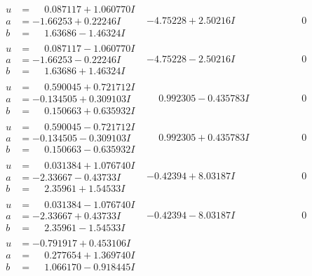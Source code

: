 \documentclass[1p]{elsarticle_modified}
\theoremstyle{definition}
\begin{document}
$$\begin{array}{c|c|c}
\begin{aligned}
u &= \phantom{-}0.087117 + 1.060770 I \\
a &= -1.66253 + 0.22246 I \\
b &= \phantom{-}1.63686 - 1.46324 I\end{aligned}
 & -4.75228 + 2.50216 I & \phantom{-0.000000 } 0 \\ \hline\begin{aligned}
u &= \phantom{-}0.087117 - 1.060770 I \\
a &= -1.66253 - 0.22246 I \\
b &= \phantom{-}1.63686 + 1.46324 I\end{aligned}
 & -4.75228 - 2.50216 I & \phantom{-0.000000 } 0 \\ \hline\begin{aligned}
u &= \phantom{-}0.590045 + 0.721712 I \\
a &= -0.134505 + 0.309103 I \\
b &= \phantom{-}0.150663 + 0.635932 I\end{aligned}
 & \phantom{-}0.992305 - 0.435783 I & \phantom{-0.000000 } 0 \\ \hline\begin{aligned}
u &= \phantom{-}0.590045 - 0.721712 I \\
a &= -0.134505 - 0.309103 I \\
b &= \phantom{-}0.150663 - 0.635932 I\end{aligned}
 & \phantom{-}0.992305 + 0.435783 I & \phantom{-0.000000 } 0 \\ \hline\begin{aligned}
u &= \phantom{-}0.031384 + 1.076740 I \\
a &= -2.33667 - 0.43733 I \\
b &= \phantom{-}2.35961 + 1.54533 I\end{aligned}
 & -0.42394 + 8.03187 I & \phantom{-0.000000 } 0 \\ \hline\begin{aligned}
u &= \phantom{-}0.031384 - 1.076740 I \\
a &= -2.33667 + 0.43733 I \\
b &= \phantom{-}2.35961 - 1.54533 I\end{aligned}
 & -0.42394 - 8.03187 I & \phantom{-0.000000 } 0 \\ \hline\begin{aligned}
u &= -0.791917 + 0.453106 I \\
a &= \phantom{-}0.277654 + 1.369740 I \\
b &= \phantom{-}1.066170 - 0.918445 I\end{aligned}

\end{array}$$
\end{document}
